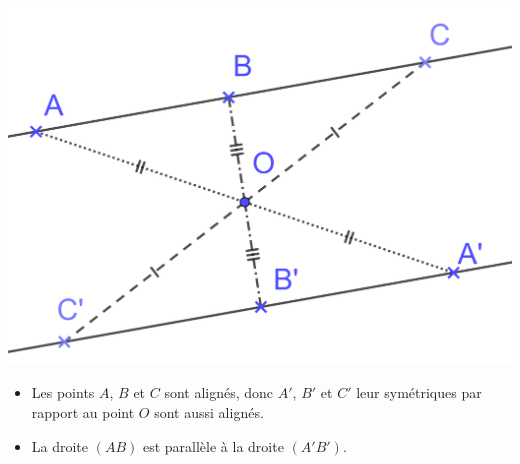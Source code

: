 \documentclass[xcolor={dvipsnames}]{beamer}
\begin{document}
\begin{frame}
	\begin{myexs}
		
		
			\begin{center}
				\includegraphics[scale=0.13]{sym_droites2}\pause
			\end{center}
			
			\begin{itemize}
				\item Les points $A$, $B$ et $C$ sont alignés, donc \pause  $A'$, $B'$ et $C'$ leur symétriques par rapport \pause au point $O$ sont aussi alignés.\pause
				\item La droite $(AB)$ est \pause parallèle à la droite $(A'B')$.
			\end{itemize}
	\end{myexs}
\end{frame}
\end{document}

